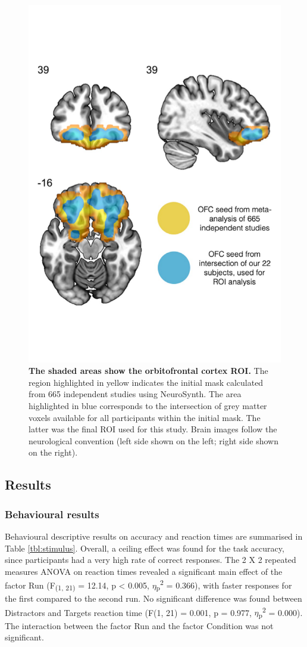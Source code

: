 \begin{figure}[h] 
\centering\includegraphics[width=0.7\linewidth]{images/Ch4/Figure2_ROI.pdf}
\caption{\textbf{The shaded areas show the orbitofrontal cortex ROI.  }   The region highlighted in yellow indicates the initial mask calculated from 665 independent studies using NeuroSynth. The area highlighted in blue corresponds to the intersection of grey matter voxels available for all participants within the initial mask. The latter was the final ROI used for this study. Brain images follow the neurological convention (left side shown on the left; right side shown on the right).} \label{fig:ROI}
\end{figure}


\subsection{Results}

\subsubsection{Behavioural results}

Behavioural descriptive results on accuracy and reaction times are summarised in Table \ref{tbl:stimulus}. Overall, a ceiling effect was found for the task accuracy, since participants had a very high rate of correct responses. The 2 X 2 repeated measures ANOVA on reaction times revealed a significant main effect of the factor Run (F\textsubscript{(1, 21)} = 12.14, p < 0.005, $\eta$\textsubscript{p}\textsuperscript{2} = 0.366), with faster responses for the first compared to the second run. No significant difference was found between Distractors and Targets reaction time (F(1, 21) = 0.001, p = 0.977, $\eta$\textsubscript{p}\textsuperscript{2} = 0.000). The interaction between the factor Run and the factor Condition was not significant.


